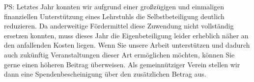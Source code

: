 \documentclass[12pt]{zettel}
\begin{document}
\vfill

PS: Letztes Jahr konnten wir aufgrund einer großzügigen und einmaligen
finanziellen Unterstützung eines Lehrstuhls die Selbstbeteiligung deutlich
reduzieren. Da anderweitige Fördermittel diese Zuwendung nicht vollständig
ersetzen konnten, muss dieses Jahr die Eigenbeteiligung leider erheblich näher
an den anfallenden Kosten
liegen. Wenn Sie unsere Arbeit unterstützen
und dadurch auch zukünftig Veranstaltungen dieser Art ermöglichen möchten,
können Sie gerne einen höheren Beitrag überweisen. Als gemeinnütziger Verein
stellen wir dann eine Spendenbescheinigung über den zusätzlichen
Betrag aus.

\newpage
\fi\ifmore\repeat

\closein\quelle
\end{document}
